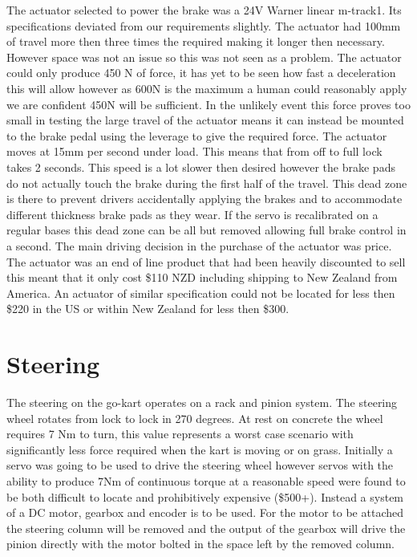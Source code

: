 The actuator selected to power the brake was a 24V Warner linear m-track1. Its
specifications deviated from our requirements slightly. The actuator had 100mm
of travel more then three times the required making it longer then necessary.
However space was not an issue so this was not seen as a problem. The actuator
could only produce 450 N of force, it has yet to be seen how fast a deceleration
this will allow however as 600N is the maximum a human could reasonably apply we
are confident 450N will be sufficient. In the unlikely event this force proves
too small in testing the large travel of the actuator means it can instead be
mounted to the brake pedal using the leverage to give the required force. The
actuator moves at 15mm per second under load. This means that from off to full
lock takes 2 seconds. This speed is a lot slower then desired however the brake
pads do not actually touch the brake during the first half of the travel. This
dead zone is there to prevent drivers accidentally applying the brakes and to
accommodate different thickness brake pads as they wear. If the servo is
recalibrated on a regular bases this dead zone can be all but removed allowing
full brake control in a second. The main driving decision in the purchase of the
actuator was price. The actuator was an end of line product that had been
heavily discounted to sell this meant that it only cost \$110 NZD including
shipping to New Zealand from America. An actuator of similar specification could
not be located for less then \$220 in the US or within New Zealand for less then
\$300.

\section{Steering}

The steering on the go-kart operates on a rack and pinion system. The steering
wheel rotates from lock to lock in 270 degrees. At rest on concrete the wheel
requires 7 Nm to turn, this value represents a worst case scenario with
significantly less force required when the kart is moving or on grass. Initially
a servo was going to be used to drive the steering wheel however servos with the
ability to produce 7Nm of continuous torque at a reasonable speed were found to
be both difficult to locate and prohibitively expensive (\$500+). Instead a
system of a DC motor, gearbox and encoder is to be used. For the motor to be
attached the steering column will be removed and the output of the gearbox
will drive the pinion directly with the motor bolted in the space left by the
removed column. %


